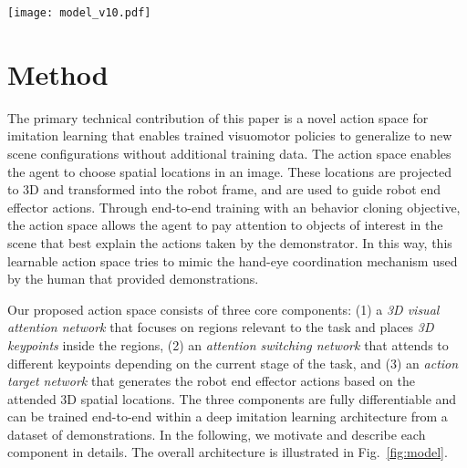 \documentclass[letterpaper, 10 pt, conference]{ieeeconf}
\newcommand{\algoName}{HAN\xspace}
\begin{document}
\begin{figure*}[ht]
	\centering
    \texttt{[image: model\_v10.pdf]}
	\caption{\textbf{Architecture Overview.} \algoName has three main components: (1) $N$ regions are randomly sample from the input image. Then a 3D visual attention network localizes a 3D keypoint $\hat{\mathbf{x}}_{kp}$ for each region. (Sec.~\ref{sec:3dattentionNet}) (2) An attention switching network generates a single target keypoint $\mathbf{x}_{kp}$ by aggregating the candidate keypoints through confidence-weighted sum. (Sec.~\ref{Sec:attention}) (3) The final local action target is set by moving the predict keypoint $\mathbf{x}_{kp}$ by a learned offset $\mathbf{x}_{offset}$. The network predicts offset $\mathbf{x}_{offset}$, control gain $k$, and the binary gripper open/close command $\mathbf{x}_{grip}$. The final output action $a$ is then calculated through the function on the bottom (Sec.~\ref{Sec:goalgrounding}).}
	\label{fig:model}
\end{figure*}

\section{Method}
\label{sec:method}
The primary technical contribution of this paper is a novel action space for imitation learning that enables trained visuomotor policies to generalize to new scene configurations without additional training data. The action space enables the agent to choose spatial locations in an image. These locations are projected to 3D and transformed into the robot frame, and are used to guide robot end effector actions. Through end-to-end training with an behavior cloning objective, the action space allows the agent to pay attention to objects of interest in the scene that best explain the actions taken by the demonstrator. In this way, this learnable action space tries to mimic the hand-eye coordination mechanism used by the human that provided demonstrations.

Our proposed action space consists of three core components: (1) a \emph{3D visual attention network} that focuses on regions relevant to the task and places \emph{3D keypoints} inside the regions, (2) an \emph{attention switching network} that attends to different keypoints depending on the current stage of the task, and (3) an \emph{action target network} that generates the robot end effector actions based on the attended 3D spatial locations. The three components are fully differentiable and can be trained end-to-end within a deep imitation learning architecture from a dataset of demonstrations. In the following, we motivate and describe each component in details. The overall architecture is illustrated in Fig.~\ref{fig:model}.
\end{document}

